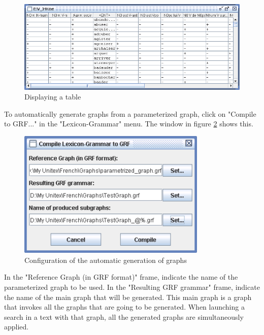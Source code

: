 \begin{figure}[!ht]
\begin{center}
\includegraphics[width=15cm]{resources/img/fig8-6.png}
\caption{Displaying a table\label{fig-table-display}}
\end{center}
\end{figure}

\bigskip
\noindent To automatically generate graphs from a parameterized graph, click on "Compile to
GRF..." in the "Lexicon-Grammar" menu. The window in figure
\ref{fig-configuration-graph-generation} shows this.

\begin{figure}[!ht]
\begin{center}
\includegraphics[width=9cm]{resources/img/fig8-7.png}
\caption{Configuration of the automatic generation of graphs\label{fig-configuration-graph-generation}}
\end{center}
\end{figure}

\bigskip
\noindent In the "Reference Graph (in GRF format)" frame, indicate the name of
the parameterized graph to be used. In the "Resulting GRF grammar" frame,
indicate the name of the main graph that will be generated. This main graph is a graph
that invokes all the graphs that are going to be generated. When launching a
search in a text with that graph, all the generated graphs are simultaneously
applied.

